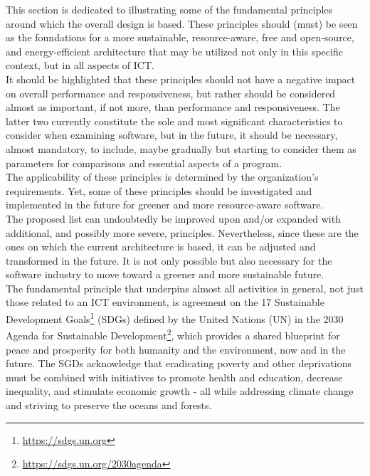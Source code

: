 This section is dedicated to illustrating some of the fundamental principles around
which the overall design is based. These principles should (must) be seen as the
foundations for a more sustainable, resource-aware, free and open-source, and energy-efficient
architecture that may be utilized not only in this specific context, but in all
aspects of ICT. \\ %
It should be highlighted that these principles should not have a negative impact
on overall performance and responsiveness, but rather should be considered almost
as important, if not more, than performance and responsiveness. The latter two
currently constitute the sole and most significant characteristics to consider
when examining software, but in the future, it should be necessary, almost mandatory,
to include, maybe gradually but starting to consider them as parameters for comparisons
and essential aspects of a program. \\ %
The applicability of these principles is determined by the organization's requirements.
Yet, some of these principles should be investigated and implemented in the future
for greener and more resource-aware software. \\ %
The proposed list can undoubtedly be improved upon and/or expanded with additional,
and possibly more severe, principles. Nevertheless, since these are the ones on which
the current architecture is based, it can be adjusted and transformed in the
future. It is not only possible but also necessary for the software industry to move
toward a greener and more sustainable future. \\ %

The fundamental principle that underpins almost all activities in general, not just
those related to an ICT environment, is agreement on the 17 Sustainable
Development Goals\footnote{\url{https://sdgs.un.org}} (SDGs) defined by the
United Nations (UN) in the 2030 Agenda for Sustainable Development\footnote{\url{https://sdgs.un.org/2030agenda}},
which provides a shared blueprint for peace and prosperity for both humanity and
the environment, now and in the future. The SGDs acknowledge that eradicating poverty
and other deprivations must be combined with initiatives to promote health and education,
decrease inequality, and stimulate economic growth - all while addressing climate
change and striving to preserve the oceans and forests.

